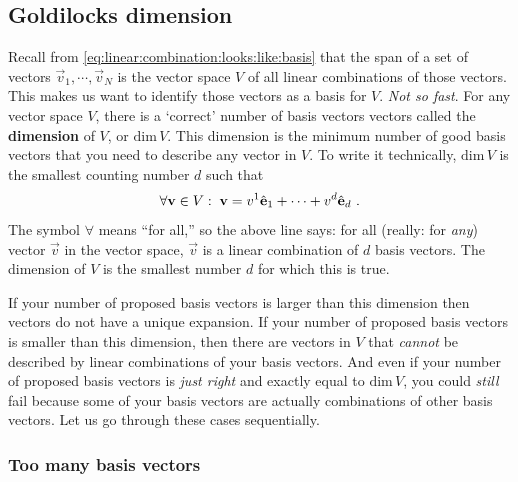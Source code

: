 \documentclass[12pt, oneside]{report}    %
\begin{document}
\subsection{Goldilocks dimension} %

Recall from \eqref{eq:linear:combination:looks:like:basis} that the span of a set of vectors $\vec{v}_1, \cdots, \vec{v}_N$ is the vector space $V$ of all linear combinations of those vectors. This makes us want to identify those vectors as a basis for $V$. \emph{Not so fast}. For any vector space $V$, there is a `correct' number of basis vectors vectors called the \textbf{dimension} of $V$, or $\text{dim}\,V$. This dimension is the minimum number of good basis vectors that you need to describe any vector in $V$. To write it technically, $\text{dim}\,V$ is the smallest counting number $d$ such that
\begin{align}
    \forall \mathbf{v} \in V :\; \mathbf{v} = v^1 \hat{\mathbf{e}}_1 + \cdots + v^{d}\hat{\mathbf{e}}_{d} \ .
\end{align}
The symbol $\forall$ means ``for all,'' so the above line says: for all (really: for \emph{any}) vector $\vec{v}$ in the vector space, $\vec{v}$ is a linear combination of $d$ basis vectors. The dimension of $V$ is the smallest number $d$ for which this is true. 

If your number of proposed basis vectors is larger than this dimension then vectors do not have a unique expansion. If your number of proposed basis vectors is smaller than this dimension, then there are vectors in $V$ that \emph{cannot} be described by linear combinations of your basis vectors. And even if your number of proposed basis vectors is \emph{just right} and exactly equal to $\text{dim}\,V$, you could \emph{still} fail because some of your basis vectors are actually combinations of other basis vectors. Let us go through these cases sequentially.

\subsubsection{Too many basis vectors}
\end{document}

